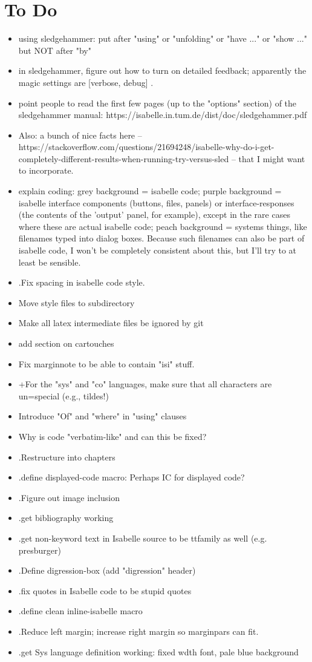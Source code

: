 \chapter*{To Do}
\begin{itemize}
\item using sledgehammer: put after "using" or "unfolding" or "have ..." or "show ..." but NOT after "by"
\item in sledgehammer, figure out how to turn on detailed feedback; apparently the magic settings are [verbose, debug] .
\item point people to read the first few pages (up to the "options" section) of the sledgehammer manual: https://isabelle.in.tum.de/dist/doc/sledgehammer.pdf
\item Also: a bunch of nice facts here -- https://stackoverflow.com/questions/21694248/isabelle-why-do-i-get-completely-different-results-when-running-try-versus-sled -- that I might want to incorporate. 
\item explain coding: grey background = isabelle code; purple background = isabelle interface components (buttons, files, panels) or interface-responses (the contents of the 'output' panel, for example), except in the rare cases where these are actual isabelle code; peach background = systems things, like filenames typed into dialog boxes. Because such filenames can also be part of isabelle code, I won't be completely consistent about this, but I'll try to at least be sensible.
\item .Fix spacing in isabelle code style.
\item Move style files to subdirectory
\item Make all latex intermediate files be ignored by git
\item add section on cartouches
\item Fix marginnote to be able to contain "isi" stuff.
\item +For the "sys" and "co" languages, make sure that all characters are un=special (e.g., tildes!)
\item Introduce "Of" and "where" in "using" clauses
\item Why is code "verbatim-like" and can this be fixed? 
\item .Restructure into chapters
\item .define displayed-code macro: Perhaps IC for displayed code? 
\item .Figure out image inclusion
\item .get bibliography working
\item .get non-keyword text in Isabelle source to be ttfamily as well (e.g. presburger)
\item .Define digression-box (add "digression" header)
\item .fix quotes in Isabelle code to be stupid quotes
\item .define clean inline-isabelle macro 
\item .Reduce left margin; increase right margin so marginpars can fit.
\item .get Sys language definition working: fixed wdth font, pale blue background
\end{itemize}

